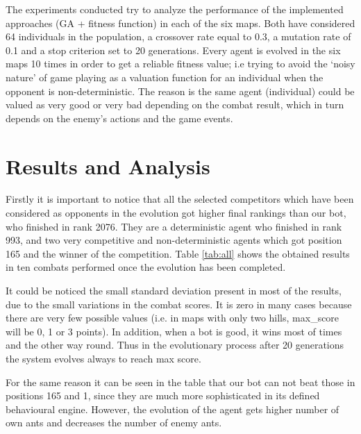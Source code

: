 \documentclass[runningheads]{llncs}
\begin{document}
The experiments conducted try to analyze the performance of the implemented approaches (GA + fitness function) in each of the six maps. Both have considered 64 individuals in the population, a crossover rate equal to 0.3, a mutation rate of 0.1 and a stop criterion set to 20 generations. Every agent is evolved in the six maps 10 times in order to get a reliable fitness value; i.e trying to avoid the `noisy nature' \cite{Mora_noisy_jcst} of game playing as a valuation function for an individual when the opponent is non-deterministic. The reason is the same agent (individual) could be valued as very good or very bad depending on the combat result, which in turn depends on the enemy's actions and the game events.


\section{Results and Analysis}
\label{sec:results}


Firstly it is important to notice that all the selected competitors which have been considered as opponents in the evolution got higher final rankings than our bot, who finished in rank 2076. They are a deterministic agent who finished in rank 993, and two very competitive and non-deterministic agents which got position 165 and the winner of the competition.
Table \ref{tab:all} shows the obtained results in ten combats performed once the evolution has been completed.



It could be noticed the small standard deviation present in most of the results, due to the small variations in the combat scores. It is zero in many cases because there are very few possible values (i.e. in maps with only two hills, max\_score will be 0, 1 or 3 points). In addition, when a bot is good, it wins most of times and the other way round.  Thus in the evolutionary process after 20 generations the system evolves always to reach max score.

For the same reason it can be seen in the table that our bot can not beat those in positions 165 and 1, since they are much more sophisticated in its defined behavioural engine. However, the evolution of the agent gets higher number of own ants and decreases the number of enemy ants. 
\end{document}
